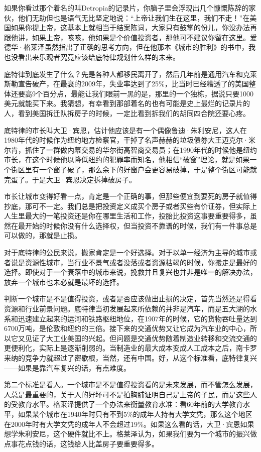 如果你看过那个着名的叫Detropia的记录片，你脑子里会浮现出几个慷慨陈辞的家伙，他们无助但也是语气无比坚定地说：``上帝让我们生在这里，我们不走！''在美国如果你提上帝，这基本上就相当于结案陈词，大家只有鼓掌的份儿，你没办法再跟他讲，如果上帝，咳咳，他如果是个价值投资者，那他可不建议你留在这里。爱德华·格莱泽虽然指出了正确的思考方向，但在他那本《城市的胜利》的书中，我也没看出来乐观者究竟应该给底特律规划什么样的未来。

底特律到底发生了什么？先是各种人都移民离开了，然后几年前是通用汽车和克莱斯勒宣告破产，在最衰的2009年，失业率达到了25\%，比当时已经糟透了的美国整体还要高9个百分点，最能让我们眼前一黑的是，那里的一个独栋，据说只要1000美元就能买下来。我猜想，有幸看到那部着名的也有可能是史上最烂的记录片的人，看到美国拆迁队拆房子的时候，一定比看到拆我们的胡同四合院还要心疼。

底特律的市长叫大卫·宾恩，估计他应该是有一个偶像鲁迪·朱利安尼，这人在1980年代的时候作为纽约地方检察官，干掉了名声赫赫的垃圾债券大王迈克尔·米尔肯，抓住了一群做内幕交易的华尔街高智商交易员；在1990年代的时候他是纽约市长，在这个时候他以降低纽约的犯罪率而知名，他相信``破窗''理论，就是如果一个街区里有一个窗子破了，那么余下的好窗户会更容易破掉，于是整个街区可能就完蛋了。于是大卫·宾恩决定拆掉破房子。

市长让城市变得好看一点，肯定是一个正确的事，但那些便宜到要死的房子就值得抄底，那可不一定。我们总是把投资定义成买个房子或者买些有价证券，但实际上人生里最大的一笔投资还是你在哪里生活和工作，投胎比投资这事要重要得多，虽然在最开始的时候你没有什么选择权，但当投资不靠谱的时候，我们有一件事总是可以做的，那就是止损。

对于底特律的公民来说，搬家肯定是一个好选择。对于以单一经济为主导的城市或者说是资源性城市，当行业不景气或者没落或者资源枯竭的时候，你搬走是最好的选择。即使对于一个衰落中的城市来说，挽救并且复兴也并非是唯一的解决办法，放弃一个城市也未必就是最坏的选择。

判断一个城市是不是值得投资，或者是否应该做出止损的决定，首先当然还是得看资源和行业前景问题。底特律当初发展起来所依赖的并非是汽车，而是五大湖的水系和迅速建立起来的运河和铁路枢纽地位，在1907年的时候，它的货物吞吐量达到6700万吨，是伦敦和纽约的三倍。接下来的交通优势又让它成为汽车业的中心，所以它又见证了大工业美国的兴起。但问题是交通优势随着制造业转移和交流交通的更便利化，实际上是逐渐削弱的。当制造业的最大成本变成人工成本之后，南卡罗来纳的竞争力就超过了密歇根，当然，还有中国。好，从这个标准看，底特律复兴------如果是靠汽车复兴的话，有点难度。

第二个标准是看人。一个城市是不是值得投资看的是未来发展，而不管怎么发展，人总是最重要的，关于人的好坏可不是拍胸脯证明自己是上帝的子民，而是这些人的受教育水平。格莱泽提供了一个办法来衡量教育水准：看60年前的大学教育水平，如果某个城市在1940年时只有不到5\%的成年人持有大学文凭，那么这个地区在2000年时有大学文凭的成年人不会超过19\%。如果这么看的话，大卫·宾恩如果想学朱利安尼，这个硬件就比不上。格莱泽认为，如果我们要为一个城市的振兴做点事花点钱的话，这钱给人比盖房子要重要得多。

